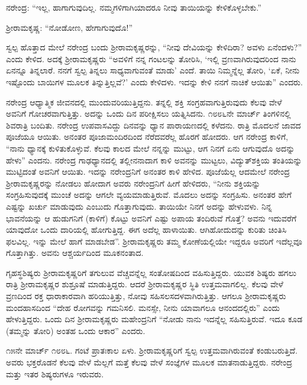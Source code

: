ನರೇಂದ್ರ: “ಇಲ್ಲ, ಹಾಗಾಗುವುದಿಲ್ಲ. ನಮ್ಮಗಳಿಗಾಗಿಯಾದರೂ ನೀವು ತಾಯಿಯನ್ನು ಕೇಳಿಕೊಳ್ಳಬೇಕು.”

ಶ‍್ರೀರಾಮಕೃಷ್ಣ: “ನೋಡೋಣ, ಹೇಗಾಗುವುದೊ!”

ಸ್ವಲ್ಪ ಹೊತ್ತಾದ ಮೇಲೆ ನರೇಂದ್ರ ಬಂದು ಶ‍್ರೀರಾಮಕೃಷ್ಣರನ್ನು, “ನೀವು ದೇವಿಯನ್ನು ಕೇಳಿದಿರಾ? ಅವಳು ಏನೆಂದಳು?” ಎಂದು ಕೇಳಿದ. ಅದಕ್ಕೆ ಶ‍್ರೀರಾಮಕೃಷ್ಣರು “ಅವಳಿಗೆ ನನ್ನ ಗಂಟಲನ್ನು ತೋರಿಸಿ, ‘ಇಲ್ಲಿ ವ್ರಣವಾಗಿರುವುದರಿಂದ ನಾನು ಏನನ್ನೂ ತಿನ್ನಲಾರೆ. ನನಗೆ ಸ್ವಲ್ಪ ತಿನ್ನಲು ಸಾಧ್ಯವಾಗುವಂತೆ ಮಾಡು’ ಎಂದೆ. ತಾಯಿ ನಿಮ್ಮನ್ನೆಲ್ಲ ತೋರಿ, ‘ಏಕೆ, ನೀನು ಇಷ್ಟೊಂದು ಬಾಯಿಗಳ ಮೂಲಕ ತಿನ್ನುತ್ತಿಲ್ಲವೆ?’ ಎಂದು ಕೇಳಿದಳು. ಇದನ್ನು ಕೇಳಿ ನನಗೆ ನಾಚಿಕೆ ಆಯಿತು” ಎಂದರು.

ನರೇಂದ್ರ ಆಧ್ಯಾತ್ಮಿಕ ಜೀವನದಲ್ಲಿ ಮುಂದುವರಿಯುತ್ತಿದ್ದನು. ತನ್ನಲ್ಲಿ ಶಕ್ತಿ ಸಂಗ್ರಹವಾಗುತ್ತಿರುವುದು ಕೆಲವು ವೇಳೆ ಅವನಿಗೆ ಗೋಚರವಾಗುತ್ತಿತ್ತು. ಅದನ್ನು ಒಂದು ದಿನ ಪರೀಕ್ಷಿಸಲು ಯತ್ನಿಸಿದನು. ೧೮೮೬ನೇ ಮಾರ್ಚ್ ತಿಂಗಳಿನಲ್ಲಿ ಶಿವರಾತ್ರಿ ಬಂದಿತು. ನರೇಂದ್ರ ಉಪವಾಸವಿದ್ದು ದಿನವನ್ನು ಧ್ಯಾನ ಪಾರಾಯಣದಲ್ಲಿ ಕಳೆದನು. ರಾತ್ರಿ ಮೊದಲನೆ ಜಾವದ ಪೂಜೆಯೂ ಆಯಿತು. ಅನಂತರ ಪೂಜಾಮಂದಿರದಿಂದ ನೆರೆದವರೆಲ್ಲ ಹೊರಗೆ ಹೋದರು. ಆಗ ನರೇಂದ್ರ ಕಾಳಿಗೆ, “ನಾನು ಧ್ಯಾನಕ್ಕೆ ಕುಳಿತುಕೊಳ್ಳುವೆ. ಕೆಲವು ಕಾಲದ ಮೇಲೆ ನನ್ನನ್ನು ಮುಟ್ಟು, ಆಗ ನಿನಗೆ ಏನು ಆಗುವುದೊ ಅದನ್ನು ಹೇಳು” ಎಂದನು. ನರೇಂದ್ರ ಗಾಢಧ್ಯಾನದಲ್ಲಿ ತಲ್ಲೀನನಾದಾಗ ಕಾಳಿ ಅವನನ್ನು ಮುಟ್ಟಲು, ವಿದ್ಯುತ್‍ಶಕ್ತಿಯ ತಂತಿಯನ್ನು ಮುಟ್ಟಿದಂತೆ ಅವನಿಗೆ ಆಯಿತು. ಇದನ್ನು ನರೇಂದ್ರನಿಗೆ ಅನಂತರ ಕಾಳಿ ಹೇಳಿದ. ಪೂಜೆಯೆಲ್ಲ ಆದಮೇಲೆ ನರೇಂದ್ರ ಶ‍್ರೀರಾಮಕೃಷ್ಣರನ್ನು ನೋಡಲು ಹೋದಾಗ ಅವರು ನರೇಂದ್ರನಿಗೆ ಹೀಗೆ ಹೇಳಿದರು, “ನೀನು ಶಕ್ತಿಯನ್ನು ಸಂಗ್ರಹಿಸುವುದಕ್ಕೆ ಮುಂಚೆ ಅದನ್ನು ಆಗಲೇ ವ್ಯಯಮಾಡುತ್ತಿರುವೆ. ಮೊದಲು ಅದನ್ನು ಸಂಗ್ರಹಿಸು. ಅನಂತರ ಹೇಗೆ ಎಷ್ಟನ್ನು ಖರ್ಚು ಮಾಡುವುದು ಎಂಬುದು ಗೊತ್ತಾಗುವುದು. ತಾಯಿಯೇ ನಿನಗೆ ಅದನ್ನು ಹೇಳುವಳು. ನಿನ್ನ ಭಾವನೆಯನ್ನು ಆ ಹುಡುಗನಿಗೆ (ಕಾಳಿಗೆ) ಕೊಟ್ಟು ಅವನಿಗೆ ಎಷ್ಟು ಅಪಾಯ ತಂದಿರುವೆ ಗೊತ್ತೆ? ಅವನು ಇದುವರೆಗೆ ಯಾವುದೋ ಒಂದು ದಾರಿಯಲ್ಲಿ ಹೋಗುತ್ತಿದ್ದ. ಈಗ ಅದೆಲ್ಲ ಹಾಳಾಯಿತು. ಆಗಿಹೋದುದನ್ನು ಕುರಿತು ಚಿಂತಿಸಿ ಫಲವಿಲ್ಲ. ಇನ್ನು ಮೇಲೆ ಹಾಗೆ ಮಾಡಬೇಡ”. ಶ‍್ರೀರಾಮಕೃಷ್ಣರು ತಮ್ಮ ಕೋಣೆಯಲ್ಲಿಯೇ ಇದ್ದರೂ ಅವರಿಗೆ ಇದೆಲ್ಲವೂ ಗೊತ್ತಾಗಿತ್ತು. ಅವನು ಆಶ್ಚರ್ಯದಿಂದ ಮೂಕನಂತಾದ.

ಗೃಹಸ್ಥಶಿಷ್ಯರು ಶ‍್ರೀರಾಮಕೃಷ್ಣರಿಗೆ ತಗುಲುವ ವೆಚ್ಚವನ್ನೆಲ್ಲ ಸಂತೋಷದಿಂದ ವಹಿಸುತ್ತಿದ್ದರು. ಯುವಕ ಶಿಷ್ಯರು ಹಗಲು ರಾತ್ರಿ ಶ‍್ರೀರಾಮಕೃಷ್ಣರ ಶುಶ್ರೂಷೆ ಮಾಡುತ್ತಿದ್ದರು. ಆದರೆ ಶ‍್ರೀರಾಮಕೃಷ್ಣರ ಸ್ಥಿತಿ ಉತ್ತಮವಾಗಲಿಲ್ಲ. ಕೆಲವು ವೇಳೆ ವ್ರಣದಿಂದ ರಕ್ತ ಧಾರಾಕಾರವಾಗಿ ಹರಿಯುತ್ತಿತ್ತು, ನೋವು ಸಹಿಸಲಸದಳವಾಗಿರುತ್ತಿತ್ತು. ಆಗಲೂ ಶ‍್ರೀರಾಮಕೃಷ್ಣರು ಮಂದಹಾಸದಿಂದ “ದೇಹ ರೋಗವನ್ನು ಗಮನಿಸಲಿ. ಮನಸ್ಸೇ, ನೀನು ಯಾವಾಗಲೂ ಆನಂದದಲ್ಲಿರು” ಎಂದು ಹೇಳುತ್ತಿದ್ದರು. ಒಂದು ದಿನ ಶ‍್ರೀರಾಮಕೃಷ್ಣರು ಮಹೇಂದ್ರನಿಗೆ “ನೋಡು ನಾನು ಇದನ್ನೆಲ್ಲ ಸಹಿಸುತ್ತಿರುವೆ. ಇದೂ ಕೂಡ (ತಮ್ಮನ್ನು ತೋರಿ) ಅಂತಹ ಒಂದು ಆಕಾರ” ಎಂದರು.

೧೫ನೇ ಮಾರ್ಚ್ ೧೮೮೬. ಗಂಟೆ ಪ್ರಾತಃಕಾಲ ಏಳು. ಶ‍್ರೀರಾಮಕೃಷ್ಣರಿಗೆ ಸ್ವಲ್ಪ ಉತ್ತಮವಾಗಿರುವಂತೆ ಕಂಡುಬರುತ್ತಿದೆ. ಅವರು ಭಕ್ತರೊಡನೆ ಕೆಲವು ವೇಳೆ ಮೆಲ್ಲಗೆ ಮತ್ತೆ ಕೆಲವು ವೇಳೆ ಸಂಜ್ಞೆಗಳ ಮೂಲಕ ಮಾತನಾಡುತ್ತಿದ್ದರು. ನರೇಂದ್ರ ಮತ್ತು ಇತರ ಶಿಷ್ಯರುಗಳೂ ಇರುವರು.

